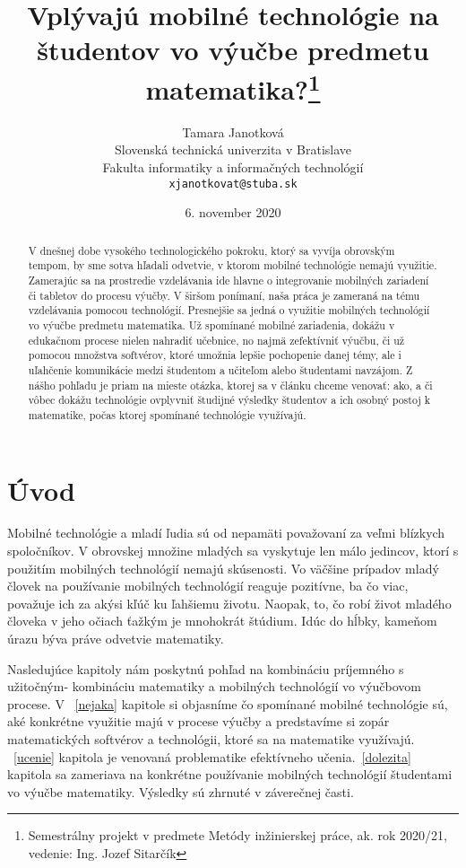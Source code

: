 \documentclass[10pt,twoside,slovak,a4paper]{article}
\title{Vplývajú mobilné technológie na študentov vo výučbe predmetu matematika?\thanks{Semestrálny projekt v predmete Metódy inžinierskej práce, ak. rok 2020/21, vedenie: Ing. Jozef Sitarčík}} %
\author{Tamara Janotková\\[2pt]
	{\small Slovenská technická univerzita v Bratislave}\\
	{\small Fakulta informatiky a informačných technológií}\\
	{\small \texttt{xjanotkovat@stuba.sk}}
	}
\date{\small 6. november 2020} %
\begin{document}
\maketitle

\begin{abstract}
V dnešnej dobe vysokého technologického pokroku, ktorý sa vyvíja obrovským tempom, by sme sotva hľadali odvetvie, v ktorom mobilné technológie nemajú využitie. Zamerajúc sa na prostredie vzdelávania ide hlavne o integrovanie mobilných zariadení či tabletov do procesu výučby. V širšom ponímaní, naša práca je zameraná na tému vzdelávania pomocou technológií. Presnejšie sa jedná o využitie mobilných technológií vo výučbe predmetu matematika. Už spomínané mobilné zariadenia, dokážu v edukačnom procese nielen nahradiť učebnice, no najmä zefektívniť výučbu, či už pomocou množstva softvérov, ktoré umožnia lepšie pochopenie danej témy, ale i uľahčenie komunikácie medzi študentom a učiteľom alebo študentami navzájom. Z nášho pohľadu je priam na mieste otázka, ktorej sa v článku chceme venovať: ako, a či vôbec dokážu technológie ovplyvniť študijné výsledky študentov a ich osobný postoj k matematike, počas ktorej spomínané technológie využívajú. 
\end{abstract}



\section{Úvod}

Mobilné technológie a mladí ľudia sú od nepamäti považovaní za veľmi blízkych spoločníkov. V obrovskej množine mladých sa vyskytuje len málo jedincov, ktorí s použitím mobilných technológií nemajú skúsenosti. Vo väčšine prípadov mladý človek na používanie mobilných technológií reaguje pozitívne, ba čo viac, považuje ich za akýsi kľúč ku ľahšiemu životu. Naopak, to, čo robí život mladého človeka v jeho očiach ťažkým je mnohokrát štúdium. Idúc do hĺbky, kameňom úrazu býva práve odvetvie matematiky.

Nasledujúce kapitoly nám poskytnú pohľad na kombináciu príjemného s užitočným- kombináciu matematiky a mobilných technológií vo výučbovom procese. V ~\ref{nejaka} kapitole si objasníme čo spomínané mobilné technológie sú, aké konkrétne využitie majú v procese výučby a predstavíme si zopár matematických softvérov a technológii, ktoré sa na matematike využívajú. ~\ref{ucenie} kapitola je venovaná problematike efektívneho učenia.~\ref{dolezita} kapitola sa zameriava na konkrétne používanie mobilných technológií študentami vo výučbe matematiky. Výsledky sú zhrnuté v záverečnej časti.
\end{document}
